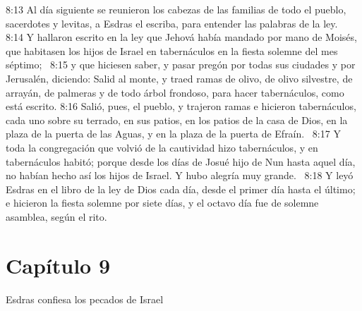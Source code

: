 8:13 Al día siguiente se reunieron los cabezas de las familias de todo el pueblo, sacerdotes y levitas, a Esdras el escriba, para entender las palabras de la ley.  
8:14 Y hallaron escrito en la ley que Jehová había mandado por mano de Moisés, que habitasen los hijos de Israel en tabernáculos en la fiesta solemne del mes séptimo;  
8:15 y que hiciesen saber, y pasar pregón por todas sus ciudades y por Jerusalén, diciendo: Salid al monte, y traed ramas de olivo, de olivo silvestre, de arrayán, de palmeras y de todo árbol frondoso, para hacer tabernáculos, como está escrito. 
8:16 Salió, pues, el pueblo, y trajeron ramas e hicieron tabernáculos, cada uno sobre su terrado, en sus patios, en los patios de la casa de Dios, en la plaza de la puerta de las Aguas, y en la plaza de la puerta de Efraín.  
8:17 Y toda la congregación que volvió de la cautividad hizo tabernáculos, y en tabernáculos habitó; porque desde los días de Josué hijo de Nun hasta aquel día, no habían hecho así los hijos de Israel. Y hubo alegría muy grande.  
8:18 Y leyó Esdras en el libro de la ley de Dios cada día, desde el primer día hasta el último; e hicieron la fiesta solemne por siete días, y el octavo día fue de solemne asamblea, según el rito.  
\section*{Capítulo 9}
Esdras confiesa los pecados de Israel  

